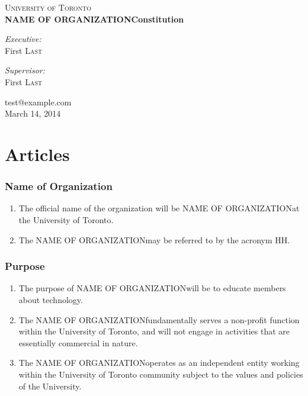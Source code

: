 \documentclass[12pt]{article}
\makeatletter
\newcommand{\orgname}{NAME OF ORGANIZATION\space}
\newcommand{\orgemail}{test@example.com}
\newcommand{\creationdate}{March 14, 2014}
\makeatother
\begin{document}

\begin{titlepage}
\begin{center}

\textsc{\LARGE University of Toronto}\\[3.0cm]

{ \huge \bfseries \orgname Constitution\\[1.0cm] }

\begin{minipage}{0.4\textwidth}
\begin{flushleft} \large
\emph{Executive:}\\
First \textsc{Last}
\end{flushleft}
\end{minipage}
\begin{minipage}{0.4\textwidth}
\begin{flushright} \large
\emph{Supervisor:} \\
First \textsc{Last}
\end{flushright}
\end{minipage}

\vfill

{\orgemail}\\
{\creationdate}
\end{center}
\end{titlepage}


\part{Articles}

\section{Name of Organization}
\begin{enumerate}[{1}.1]
    \item The official name of the organization will be \orgname at the University of Toronto.
    \item The \orgname may be referred to by the acronym HH.
\end{enumerate}


\section{Purpose}
\begin{enumerate}[{2}.1]
    \item	The purpose of \orgname will be to educate members about technology.
    \item	The \orgname fundamentally serves a non-profit function within the University of Toronto, and will not engage in activities that are essentially commercial in nature. 
    \item	The \orgname operates as an independent entity working within the University of Toronto community subject to the values and policies of the University.  
\end{enumerate}
\end{document}
